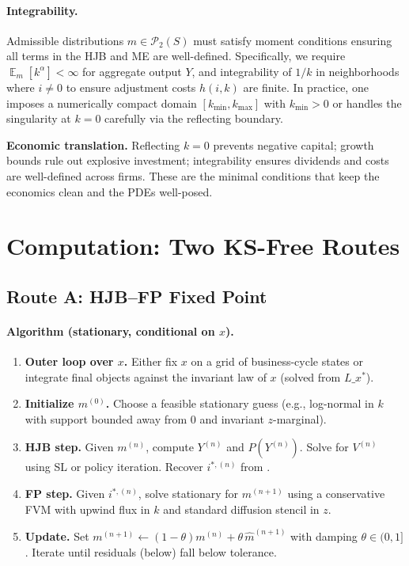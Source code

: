 ﻿\documentclass[11pt,letterpaper,oneside]{article}
\numberwithin{equation}{section}
\newcommand{\ac}[1]{{\mdseries\textsc{#1}}}
\DeclareMathOperator{\E}{\mathbb{E}}
\newcommand{\1}{\mathbf{1}}
\newcommand{\Lx}{L\_x}
\begin{document}
\begin{tcolorbox}[didacticstyle]
\begin{itemize}[leftmargin=1.1em,itemsep=0.25em]
\paragraph{Integrability.} Admissible distributions $m\in\mathcal{P}_2(S)$ must satisfy moment conditions ensuring all terms in the HJB and ME are well-defined. Specifically, we require $\E_m[k^\alpha]<\infty$ for aggregate output $Y$, and integrability of $1/k$ in neighborhoods where $i\neq 0$ to ensure adjustment costs $h(i,k)$ are finite. In practice, one imposes a numerically compact domain $[k_{\min}, k_{\max}]$ with $k_{\min}>0$ or handles the singularity at $k=0$ carefully via the reflecting boundary.

\begin{tcolorbox}[didacticstyle]
\textbf{Economic translation.} Reflecting $k=0$ prevents negative capital; growth bounds rule out explosive investment; integrability ensures dividends and costs are well-defined across firms. These are the minimal conditions that keep the economics clean and the PDEs well-posed.
\end{tcolorbox}

\section{Computation: Two KS-Free Routes}

\subsection{Route A: \ac{HJB}--\ac{FP} Fixed Point}\label{sec:routeA}

\paragraph{Algorithm (stationary, conditional on $x$).}
\begin{enumerate}[leftmargin=1.5em,label=\textbf{A.\arabic*}]
\item \textbf{Outer loop over $x$.} Either fix $x$ on a grid of business-cycle states or integrate final objects against the invariant law of $x$ (solved from $\Lx^\ast$).
\item \textbf{Initialize $m^{(0)}$.} Choose a feasible stationary guess (e.g., log-normal in $k$ with support bounded away from $0$ and invariant $z$-marginal).
\item \textbf{HJB step.} Given $m^{(n)}$, compute $Y^{(n)}$ and $P(Y^{(n)})$. Solve  for $V^{(n)}$ using \ac{SL} or policy iteration. Recover $i^{*,(n)}$ from .
\item \textbf{FP step.} Given $i^{*,(n)}$, solve stationary  for $m^{(n+1)}$ using a conservative \ac{FVM} with upwind flux in $k$ and standard diffusion stencil in $z$.
\item \textbf{Update.} Set $m^{(n+1)}\leftarrow (1-\theta)m^{(n)}+\theta\,\widehat m^{(n+1)}$ with damping $\theta\in(0,1]$. Iterate until residuals (below) fall below tolerance.
\end{enumerate}


\end{itemize}
\end{tcolorbox}
\end{document}
